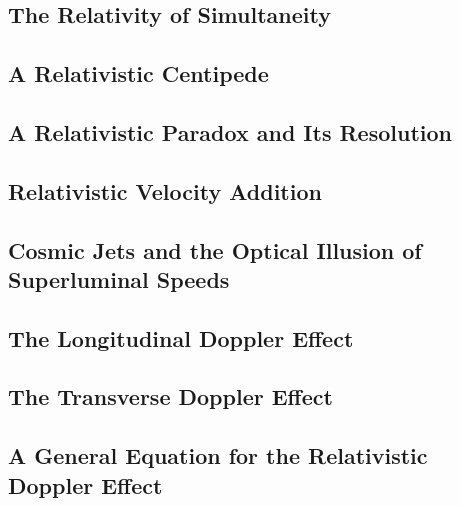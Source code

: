 \documentclass[twocolumn]{article}
\begin{document}
\subsection{The Relativity of Simultaneity}
\begin{outline}
\1 
\end{outline}
\subsection{A Relativistic Centipede}
\begin{outline}
\1 
\end{outline}
\subsection{A Relativistic Paradox and Its Resolution}
\begin{outline}
\1 
\end{outline}
\subsection{Relativistic Velocity Addition}
\begin{outline}
\1 
\end{outline}
\subsection{Cosmic Jets and the Optical Illusion of Superluminal Speeds}
\begin{outline}
\1 
\end{outline}
\subsection{The Longitudinal Doppler Effect}
\begin{outline}
\1 
\end{outline}
\subsection{The Transverse Doppler Effect}
\begin{outline}
\1 
\end{outline}
\subsection{A General Equation for the Relativistic Doppler Effect}
\begin{outline}
\1 
\end{outline}
\end{document}
